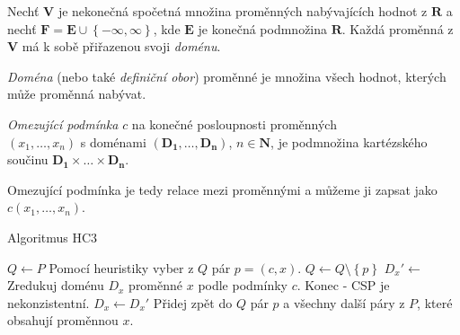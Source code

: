 Nechť $\boldsymbol{V}$ je nekonečná spočetná množina proměnných nabývajících hodnot z $\boldsymbol{R}$ a nechť $\boldsymbol{F}=\boldsymbol{E} \cup \left\{ -\infty, \infty \right\}$, kde $\boldsymbol{E}$ je konečná podmnožina $\boldsymbol{R}$. Každá proměnná z $\boldsymbol{V}$ má k sobě přiřazenou svoji \emph{doménu}.

\begin{definition}
\emph{Doména} (nebo také \emph{definiční obor}) proměnné je množina všech hodnot, kterých může proměnná nabývat.
\end{definition}

\begin{definition}
\emph{Omezující podmínka} $c$ na konečné posloupnosti proměnných\\$(x_1, \dots, x_n)$ s doménami $(\boldsymbol{D_1}, \dots, \boldsymbol{D_n})$, $n \in \boldsymbol{N}$, je podmnožina kartézského součinu $\boldsymbol{D_1} \times \dots \times \boldsymbol{D_n}$.
\end{definition}

Omezující podmínka je tedy relace mezi proměnnými a můžeme ji zapsat jako $c(x_1, \dots, x_n)$.

\begin{algorithm}
\caption{Algoritmus HC3}
\label{HC3Algorithm}
\begin{algorithmic}[1]
\State $Q \gets P$
\State Pomocí heuristiky vyber z $Q$ pár $p = (c, x)$.
\State $Q \gets Q \setminus \left\{ p \right\}$
\State $D_x' \gets$ Zredukuj doménu $D_x$ proměnné $x$ podle podmínky $c$.
\State Konec - CSP je nekonzistentní.
\EndIf
{}
\State $D_x \gets D_x'$
\State Přidej zpět do $Q$ pár $p$ a všechny další páry z $P$, které obsahují proměnnou $x$.
\EndIf
\EndWhile
\EndProcedure
\end{algorithmic}
\end{algorithm}
